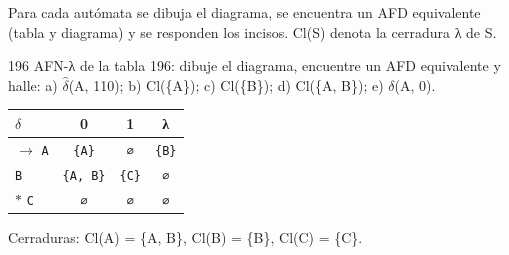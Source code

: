 \documentclass[11pt]{article}
\begin{document}
Para cada autómata se dibuja el diagrama, se encuentra un AFD equivalente (tabla y diagrama) y se responden los incisos. Cl(S) denota la cerradura λ de S.

\begin{ejercicio}{196}{}
AFN-λ de la tabla 196: dibuje el diagrama, encuentre un AFD equivalente y halle: a) $\hat\delta$(A, 110); b) Cl(\{A\}); c) Cl(\{B\}); d) Cl(\{A, B\}); e) $\delta$(A, 0).
\end{ejercicio}
\proc \begin{center}\small\begin{tabular}{lccc}\toprule
$\delta$ & 0 & 1 & λ \\\midrule
$\to$ \texttt{A} & \texttt{\{A\}} & \texttt{∅} & \texttt{\{B\}} \\
 \texttt{B} & \texttt{\{A, B\}} & \texttt{\{C\}} & \texttt{∅} \\
$*$ \texttt{C} & \texttt{∅} & \texttt{∅} & \texttt{∅} \\
\bottomrule\end{tabular}\end{center}
Cerraduras: Cl(A) = \{A, B\}, Cl(B) = \{B\}, Cl(C) = \{C\}.
\end{document}
